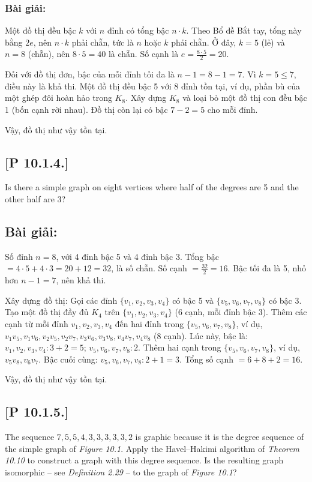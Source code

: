 \documentclass[a4paper,12pt]{article}
\begin{document}
\subsubsection*{Bài giải:}
Một đồ thị đều bậc \( k \) với \( n \) đỉnh có tổng bậc \( n \cdot k \). Theo Bổ đề Bắt tay, tổng này bằng \( 2e \), nên \( n \cdot k \) phải chẵn, tức là \( n \) hoặc \( k \) phải chẵn. Ở đây, \( k = 5 \) (lẻ) và \( n = 8 \) (chẵn), nên \( 8 \cdot 5 = 40 \) là chẵn. Số cạnh là \( e = \frac{8 \cdot 5}{2} = 20 \).

Đối với đồ thị đơn, bậc của mỗi đỉnh tối đa là \( n-1 = 8-1 = 7 \). Vì \( k = 5 \leq 7 \), điều này là khả thi. Một đồ thị đều bậc 5 với 8 đỉnh tồn tại, ví dụ, phần bù của một ghép đôi hoàn hảo trong \( K_8 \). Xây dựng \( K_8 \) và loại bỏ một đồ thị con đều bậc 1 (bốn cạnh rời nhau). Đồ thị còn lại có bậc \( 7 - 2 = 5 \) cho mỗi đỉnh.

Vậy, đồ thị như vậy tồn tại.

\subsection*{[P 10.1.4.]} Is there a simple graph on eight vertices where half of the degrees are 5 and the other half are 3?
\subsection*{Bài giải:}
Số đỉnh \( n = 8 \), với 4 đỉnh bậc 5 và 4 đỉnh bậc 3. Tổng bậc \( = 4 \cdot 5 + 4 \cdot 3 = 20 + 12 = 32 \), là số chẵn. Số cạnh \( = \frac{32}{2} = 16 \). Bậc tối đa là 5, nhỏ hơn \( n-1 = 7 \), nên khả thi.

Xây dựng đồ thị: Gọi các đỉnh \( \{v_1, v_2, v_3, v_4\} \) có bậc 5 và \( \{v_5, v_6, v_7, v_8\} \) có bậc 3. Tạo một đồ thị đầy đủ \( K_4 \) trên \( \{v_1, v_2, v_3, v_4\} \) (6 cạnh, mỗi đỉnh bậc 3). Thêm các cạnh từ mỗi đỉnh \( v_1, v_2, v_3, v_4 \) đến hai đỉnh trong \( \{v_5, v_6, v_7, v_8\} \), ví dụ, \( v_1v_5, v_1v_6, v_2v_5, v_2v_7, v_3v_6, v_3v_8, v_4v_7, v_4v_8 \) (8 cạnh). Lúc này, bậc là: \( v_1, v_2, v_3, v_4: 3 + 2 = 5 \); \( v_5, v_6, v_7, v_8: 2 \). Thêm hai cạnh trong \( \{v_5, v_6, v_7, v_8\} \), ví dụ, \( v_5v_8, v_6v_7 \). Bậc cuối cùng: \( v_5, v_6, v_7, v_8: 2 + 1 = 3 \). Tổng số cạnh \( = 6 + 8 + 2 = 16 \).

Vậy, đồ thị như vậy tồn tại.

\subsection*{[P 10.1.5.]} The sequence $7, 5, 5, 4, 3, 3, 3, 3, 3, 2$ is graphic because it is the degree sequence of the simple graph of \textit{Figure 10.1}. Apply the Havel–Hakimi algorithm of \textit{Theorem 10.10} to construct a graph with this degree sequence. Is the resulting graph isomorphic – see \textit{Definition 2.29} – to the graph of \textit{Figure 10.1}?
\end{document}
